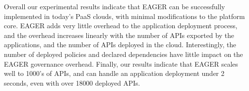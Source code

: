 Overall our experimental results indicate that EAGER can be successfully implemented in today's PaaS clouds, 
with minimal modifications to the platform core.
EAGER adds very little overhead to the application deployment process, and the
overhead increases linearly with the number of APIs exported by the applications, and the number of APIs deployed in the cloud. 
Interestingly, the number of deployed policies and declared dependencies
have little impact on the EAGER governance overhead. Finally, our results indicate that EAGER scales
well to 1000's of APIs, and can handle an application deployment under 2 seconds, even with over 18000 deployed APIs.